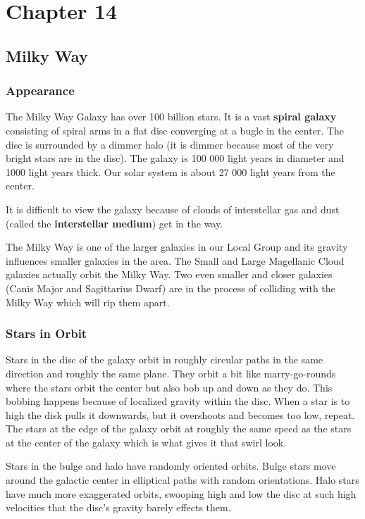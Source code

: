 \section{Chapter 14}
\subsection{Milky Way}
\subsubsection{Appearance}
The Milky Way Galaxy has over 100 billion stars. It is a vast \textbf{spiral galaxy} consisting of spiral arms in a flat disc converging at a bugle in the center. The disc is surrounded by a dimmer halo (it is dimmer because most of the very bright stars are in the disc). The galaxy is 100 000 light years in diameter and 1000 light years thick. Our solar system is about 27 000 light years from the center.

It is difficult to view the galaxy because of clouds of interstellar gas and dust (called the \textbf{interstellar medium}) get in the way.

The Milky Way is one of the larger galaxies in our Local Group and its gravity influences smaller galaxies in the area. The Small and Large Magellanic Cloud galaxies actually orbit the Milky Way. Two even smaller and closer galaxies (Canis Major and Sagittarius Dwarf) are in the process of colliding with the Milky Way which will rip them apart.

\subsubsection{Stars in Orbit}
Stars in the disc of the galaxy orbit in roughly circular paths in the same direction and roughly the same plane. They orbit a bit like marry-go-rounds where the stars orbit the center but also bob up and down as they do. This bobbing happens because of localized gravity within the disc. When a star is to high the disk pulls it downwards, but it overshoots and becomes too low, repeat. The stars at the edge of the galaxy orbit at roughly the same speed as the stars at the center of the galaxy which is what gives it that swirl look.

Stars in the bulge and halo have randomly oriented orbits. Bulge stars move around the galactic center in elliptical paths with random orientations. Halo stars have much more exaggerated orbits, swooping high and low the disc at such high velocities that the disc's gravity barely effects them.


